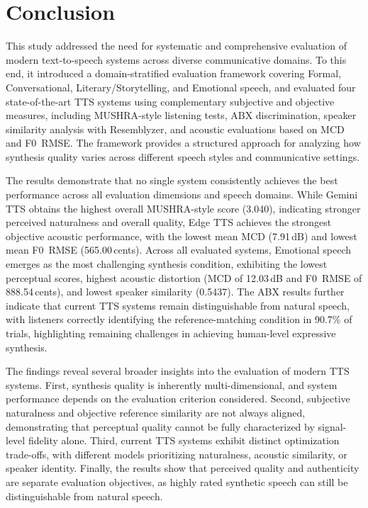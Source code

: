 \documentclass[a4paper,fleqn]{cas-dc}
\begin{document}
    \section{Conclusion}\label{sec:conclusion}
\hspace*{1.2em} This study addressed the need for systematic and comprehensive evaluation of modern text-to-speech systems across diverse communicative domains. To this end, it introduced a domain-stratified evaluation framework covering Formal, Conversational, Literary/Storytelling, and Emotional speech, and evaluated four state-of-the-art TTS systems using complementary subjective and objective measures, including MUSHRA-style listening tests, ABX discrimination, speaker similarity analysis with Resemblyzer, and acoustic evaluations based on MCD and F0~RMSE. The framework provides a structured approach for analyzing how synthesis quality varies across different speech styles and communicative settings.

\hspace*{1.2em} The results demonstrate that no single system consistently achieves the best performance across all evaluation dimensions and speech domains. While Gemini TTS obtains the highest overall MUSHRA-style score (3.040), indicating stronger perceived naturalness and overall quality, Edge TTS achieves the strongest objective acoustic performance, with the lowest mean MCD (7.91\,dB) and lowest mean F0~RMSE (565.00\,cents). Across all evaluated systems, Emotional speech emerges as the most challenging synthesis condition, exhibiting the lowest perceptual scores, highest acoustic distortion (MCD of 12.03\,dB and F0~RMSE of 888.54\,cents), and lowest speaker similarity (0.5437). The ABX results further indicate that current TTS systems remain distinguishable from natural speech, with listeners correctly identifying the reference-matching condition in 90.7\% of trials, highlighting remaining challenges in achieving human-level expressive synthesis.

\hspace*{1.2em} The findings reveal several broader insights into the evaluation of modern TTS systems. First, synthesis quality is inherently multi-dimensional, and system performance depends on the evaluation criterion considered. Second, subjective naturalness and objective reference similarity are not always aligned, demonstrating that perceptual quality cannot be fully characterized by signal-level fidelity alone. Third, current TTS systems exhibit distinct optimization trade-offs, with different models prioritizing naturalness, acoustic similarity, or speaker identity. Finally, the results show that perceived quality and authenticity are separate evaluation objectives, as highly rated synthetic speech can still be distinguishable from natural speech.
\end{document}
